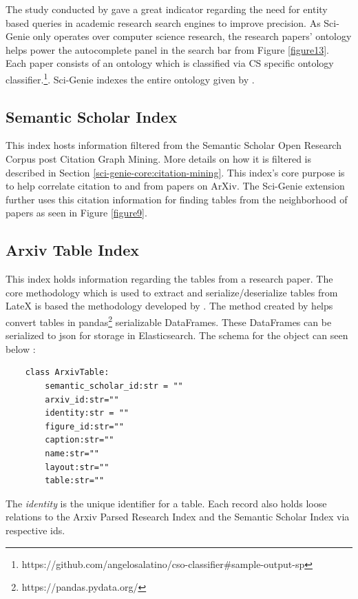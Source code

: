 The study conducted by \cite{li2017investigating} gave a great indicator regarding the need for entity based queries in academic research search engines to improve precision. As Sci-Genie only operates over computer science research, the research papers’ ontology helps power the autocomplete panel in the search bar from Figure \ref{figure13}. Each paper consists of an ontology which is classified via CS specific ontology classifier.\footnote{https://github.com/angelosalatino/cso-classifier\#sample-output-sp}. Sci-Genie indexes the entire ontology given by \cite{salatino2020ontology}. 

\subsection{Semantic Scholar Index}
\label{sci-genie-core:data-layer:ss-index}
This index hosts information filtered from the Semantic Scholar Open Research Corpus\parencite{ammar-etal-2018-construction} post Citation Graph Mining. More details on how it is filtered is described in Section \ref{sci-genie-core:citation-mining}. This index’s core purpose is to help correlate citation to and from papers on ArXiv. The Sci-Genie extension further uses this citation information for finding tables from the neighborhood of papers as seen in Figure \ref{figure9}. 


\subsection{Arxiv Table Index}
\label{sci-genie-core:data-layer:table-index}
This index holds information regarding the tables from a research paper. The core methodology which is used to extract and serialize/deserialize tables from LateX is based the methodology developed by \cite{kardas2020axcell}. The method created by  \cite{kardas2020axcell} helps convert tables in pandas\footnote{https://pandas.pydata.org/} serializable DataFrames. These DataFrames can be serialized to json for storage in Elasticsearch. The schema for the object can seen below : 
\begin{verbatim}
    class ArxivTable:
        semantic_scholar_id:str = ""
        arxiv_id:str=""
        identity:str = ""
        figure_id:str=""
        caption:str=""
        name:str=""
        layout:str=""
        table:str=""
\end{verbatim}

The \textit{identity} is the unique identifier for a table. Each record also holds loose relations to the Arxiv Parsed Research Index and the Semantic Scholar Index via respective ids. 

